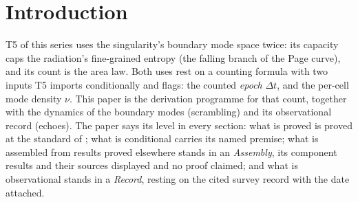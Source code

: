 \documentclass[11pt]{article}
\theoremstyle{definition}
\theoremstyle{plain}
\begin{document}
\noindent{}
\newpage

\section{Introduction}

\label{c:note.scrambling.setting-introduction}
T5 of this series \cite{ButlerT5} uses the singularity's boundary mode space twice: its capacity caps the radiation's fine-grained entropy (the falling branch of the Page curve), and its count is the area law. Both uses rest on a counting formula with two inputs T5 imports conditionally and flags: the counted \emph{epoch} $\Delta t$, and the per-cell mode density $\nu$. This paper is the derivation programme for that count, together with the dynamics of the boundary modes (scrambling) and its observational record (echoes). The paper says its level in every section: what is proved is proved at the standard of \cite{ButlerT1}; what is conditional carries its named premise; what is assembled from results proved elsewhere stands in an \emph{Assembly}, its component results and their sources displayed and no proof claimed; and what is observational stands in a \emph{Record}, resting on the cited survey record with the date attached.
\end{document}
